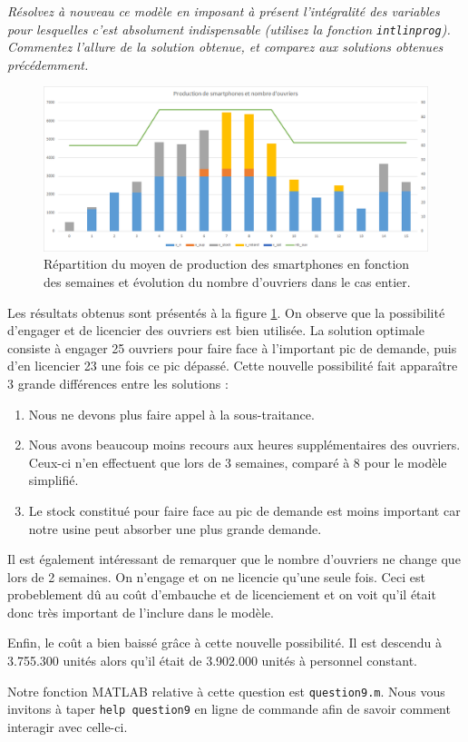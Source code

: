 \question %
\emph{Résolvez à nouveau ce modèle en imposant à présent l'intégralité des
variables pour lesquelles c'est absolument indispensable
(utilisez la fonction \texttt{intlinprog}).
Commentez l'allure de la solution obtenue,
et comparez aux solutions obtenues précédemment.}

\begin{figure}[H]
  \begin{center}
    \includegraphics[scale = 0.8]{img/grapheProductionOuv.png}
	  \caption{Répartition du moyen de production des smartphones en fonction des semaines et évolution du nombre d'ouvriers dans le cas entier.}
	  \label{fig:grapheProductionOuv}
  \end{center}
\end{figure}

Les résultats obtenus sont présentés à la figure \ref{fig:grapheProductionOuv}. On observe que la possibilité d'engager et de licencier des ouvriers est bien utilisée. La solution optimale consiste à engager 25 ouvriers pour faire face à l'important pic de demande, puis d'en licencier 23 une fois ce pic dépassé. Cette nouvelle possibilité fait apparaître 3 grande différences entre les solutions : 
\begin{enumerate}
\item Nous ne devons plus faire appel à la sous-traitance.
\item Nous avons beaucoup moins recours aux heures supplémentaires des ouvriers. Ceux-ci n'en effectuent que lors de 3 semaines, comparé à 8 pour le modèle simplifié.
\item Le stock constitué pour faire face au pic de demande est moins important car notre usine peut absorber une plus grande demande.
\end{enumerate}
Il est également intéressant de remarquer que le nombre d'ouvriers ne change que lors de 2 semaines. On n'engage et on ne licencie qu'une seule fois. Ceci est probeblement dû au coût d'embauche et de licenciement et on voit qu'il était donc très important de l'inclure dans le modèle. 

Enfin, le coût a bien baissé grâce à cette nouvelle possibilité. Il est descendu à 3.755.300 unités alors qu'il était de 3.902.000 unités à personnel constant.

Notre fonction MATLAB relative à cette question est \texttt{question9.m}. Nous vous invitons à taper \texttt{help question9} en ligne de commande afin de savoir comment interagir avec celle-ci.